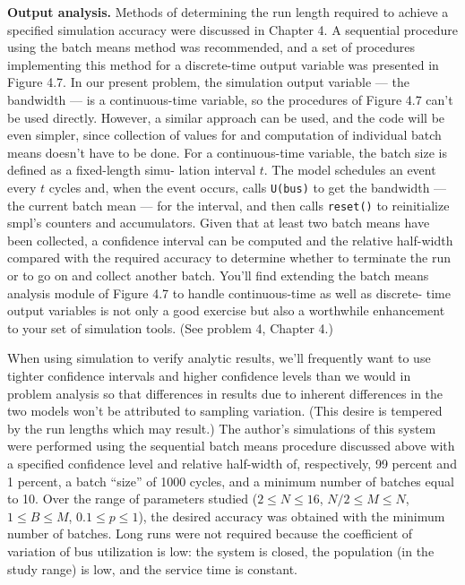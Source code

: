 \noindent\textbf{Output analysis.} Methods of determining the run length required to
achieve a specified simulation accuracy were discussed in Chapter 4. A
sequential procedure using the batch means method was recommended, and a
set of procedures implementing this method for a discrete-time output
variable was presented in Figure 4.7. In our present problem, the simulation
output variable --- the bandwidth --- is a continuous-time variable, so the
procedures of Figure 4.7 can't be used directly. However, a similar approach
can be used, and the code will be even simpler, since collection of values for
and computation of individual batch means doesn't have to be done. For a
continuous-time variable, the batch size is defined as a fixed-length simu-
\noindent lation interval $t$. The model schedules an event every $t$ cycles and, when the
event occurs, calls \texttt{U(bus)} to get the bandwidth --- the current batch mean ---
for the interval, and then calls \texttt{reset()} to reinitialize smpl's counters and
accumulators. Given that at least two batch means have been collected, a
confidence interval can be computed and the relative half-width compared
with the required accuracy to determine whether to terminate the run or to
go on and collect another batch. You'll find extending the batch means
analysis module of Figure 4.7 to handle continuous-time as well as discrete-
time output variables is not only a good exercise but also a worthwhile
enhancement to your set of simulation tools. (See problem 4, Chapter 4.)

When using simulation to verify analytic results, we'll frequently want
to use tighter confidence intervals and higher confidence levels than we
would in problem analysis so that differences in results due to inherent
differences in the two models won't be attributed to sampling variation.
(This desire is tempered by the run lengths which may result.) The author's
simulations of this system were performed using the sequential batch means
procedure discussed above with a specified confidence level and relative
half-width of, respectively, 99 percent and 1 percent, a batch ``size'' of 1000
cycles, and a minimum number of batches equal to 10. Over the range of
parameters studied ($2\le N\le16$, $N/2\le M\le N$, $1\le B\le M$, $0.1\le p\le1$), the desired
accuracy was obtained with the minimum number of batches. Long runs were
not required because the coefficient of variation of bus utilization is low: the
system is closed, the population (in the study range) is low, and the service
time is constant.

